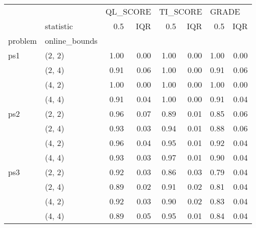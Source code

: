 \begin{tabular}{llrrrrrr}
\toprule
    & {} & \multicolumn{2}{l}{QL\_SCORE} & \multicolumn{2}{l}{TI\_SCORE} & \multicolumn{2}{l}{GRADE} \\
    & statistic &      0.5 &  IQR &      0.5 &  IQR &   0.5 &  IQR \\
problem & online\_bounds &          &      &          &      &       &      \\
\midrule
ps1 & (2, 2) &     1.00 & 0.00 &     1.00 & 0.00 &  1.00 & 0.00 \\
    & (2, 4) &     0.91 & 0.06 &     1.00 & 0.00 &  0.91 & 0.06 \\
    & (4, 2) &     1.00 & 0.00 &     1.00 & 0.00 &  1.00 & 0.00 \\
    & (4, 4) &     0.91 & 0.04 &     1.00 & 0.00 &  0.91 & 0.04 \\
ps2 & (2, 2) &     0.96 & 0.07 &     0.89 & 0.01 &  0.85 & 0.06 \\
    & (2, 4) &     0.93 & 0.03 &     0.94 & 0.01 &  0.88 & 0.06 \\
    & (4, 2) &     0.96 & 0.04 &     0.95 & 0.01 &  0.92 & 0.04 \\
    & (4, 4) &     0.93 & 0.03 &     0.97 & 0.01 &  0.90 & 0.04 \\
ps3 & (2, 2) &     0.92 & 0.03 &     0.86 & 0.03 &  0.79 & 0.04 \\
    & (2, 4) &     0.89 & 0.02 &     0.91 & 0.02 &  0.81 & 0.04 \\
    & (4, 2) &     0.92 & 0.03 &     0.90 & 0.02 &  0.83 & 0.04 \\
    & (4, 4) &     0.89 & 0.05 &     0.95 & 0.01 &  0.84 & 0.04 \\
\bottomrule
\end{tabular}

